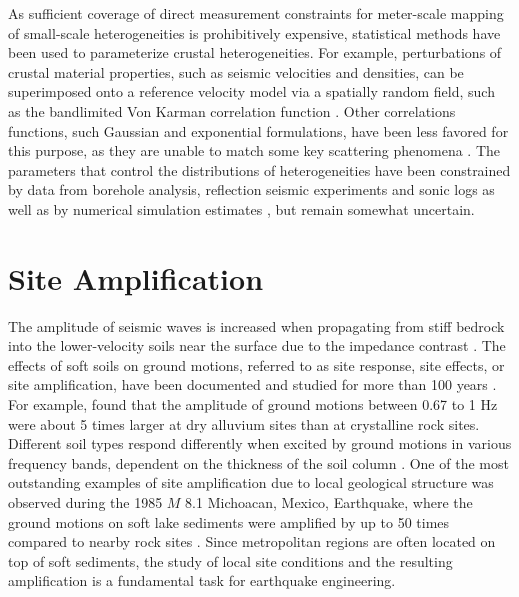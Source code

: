 As sufficient coverage of direct measurement constraints for meter-scale mapping of small-scale heterogeneities is prohibitively expensive, statistical methods have been used to parameterize crustal heterogeneities. For example, perturbations of crustal material properties, such as seismic velocities and densities, can be superimposed onto a reference velocity model via a spatially random field, such as the bandlimited Von Karman correlation function \citep[][\cref{app:A}]{frankelFiniteDifferenceSimulations1986,hartzellEffects3DRandom2010}. Other correlations functions, such Gaussian and exponential formulations, have been less favored for this purpose, as they are unable to match some key scattering phenomena \citep{frankelFiniteDifferenceSimulations1986}. The parameters that control the distributions of heterogeneities have been constrained by data from borehole analysis, reflection seismic experiments and sonic logs  as well as by numerical simulation estimates \citep{thyboSeismicScatteringTop2003,nielsenIdentificationCrustalUpper2006, przybillaEstimationCrustalScattering2009, imperatoriBroadbandNearfieldGround2013, imperatoriRoleTopographyLateral2015}, but remain somewhat uncertain.


\section{Site Amplification}

The amplitude of seismic waves is increased when propagating from stiff bedrock into the lower-velocity soils near the surface due to the impedance contrast \citep{booreShortperiodSwaveRadiation1986,silvaEngineeringCharacterizationStrong1995}. The effects of soft soils on ground motions, referred to as site response, site effects, or site amplification, have been documented and studied for more than 100 years . For example, \citet{gutenbergEffectsGroundEarthquake1957} found that the amplitude of ground motions between 0.67 to 1 Hz were about 5 times larger at dry alluvium sites than at crystalline rock sites.  Different soil types respond differently when excited by ground motions in various frequency bands, dependent on the thickness of the soil column \citep{akiLocalSiteEffects1993}. One of the most outstanding examples of site amplification due to local geological structure was observed during the 1985 $M$ 8.1 Michoacan, Mexico, Earthquake, where the ground motions on soft lake sediments were amplified by up to 50 times compared to nearby rock sites \citep{singh1993origin}. Since metropolitan regions are often located on top of soft sediments, the study of local site conditions and the resulting amplification is a fundamental task for earthquake engineering.

